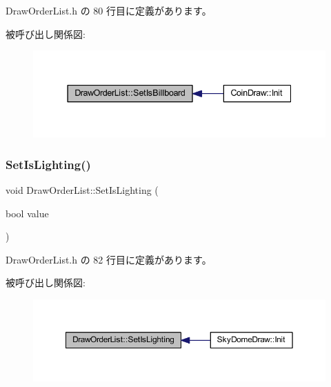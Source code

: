  Draw\+Order\+List.\+h の 80 行目に定義があります。

被呼び出し関係図\+:\nopagebreak
\begin{figure}[H]
\begin{center}
\leavevmode
\includegraphics[width=337pt]{class_draw_order_list_abfb13518e5747d3faa351ca64ec676b2_icgraph}
\end{center}
\end{figure}
\mbox{\label{class_draw_order_list_a233843bc98d389d9cfc79108b599c7a9}} 
\subsubsection{\texorpdfstring{Set\+Is\+Lighting()}{SetIsLighting()}}
{\footnotesize\ttfamily void Draw\+Order\+List\+::\+Set\+Is\+Lighting (\begin{DoxyParamCaption}\item[{bool}]{value }\end{DoxyParamCaption})\hspace{0.3cm}{\ttfamily [inline]}}



 Draw\+Order\+List.\+h の 82 行目に定義があります。

被呼び出し関係図\+:\nopagebreak
\begin{figure}[H]
\begin{center}
\leavevmode
\includegraphics[width=350pt]{class_draw_order_list_a233843bc98d389d9cfc79108b599c7a9_icgraph}
\end{center}
\end{figure}
\mbox{\label{class_draw_order_list_a5559a24f4d87d9d087d9daabed9a11f3}} 
